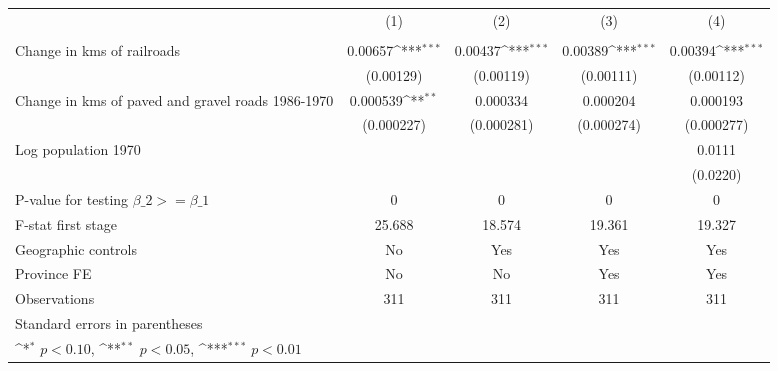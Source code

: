 {
\def\sym#1{\ifmmode^{#1}\else\(^{#1}\)\fi}
\begin{tabular}{l*{4}{c}}
\hline\hline
                &\multicolumn{1}{c}{(1)}&\multicolumn{1}{c}{(2)}&\multicolumn{1}{c}{(3)}&\multicolumn{1}{c}{(4)}\\
                &\multicolumn{1}{c}{}&\multicolumn{1}{c}{}&\multicolumn{1}{c}{}&\multicolumn{1}{c}{}\\
\hline
Change in kms of railroads&  0.00657\sym{***}&  0.00437\sym{***}&  0.00389\sym{***}&  0.00394\sym{***}\\
                &(0.00129)         &(0.00119)         &(0.00111)         &(0.00112)         \\
[1em]
Change in kms of paved and gravel roads 1986-1970& 0.000539\sym{**} & 0.000334         & 0.000204         & 0.000193         \\
                &(0.000227)         &(0.000281)         &(0.000274)         &(0.000277)         \\
[1em]
Log population 1970&                  &                  &                  &   0.0111         \\
                &                  &                  &                  & (0.0220)         \\
\hline
P-value for testing $\beta\_{2} >= \beta\_{1}$&        0         &        0         &        0         &        0         \\
F-stat first stage&   25.688         &   18.574         &   19.361         &   19.327         \\
Geographic controls&       No         &      Yes         &      Yes         &      Yes         \\
Province FE     &       No         &       No         &      Yes         &      Yes         \\
Observations    &      311         &      311         &      311         &      311         \\
\hline\hline
\multicolumn{5}{l}{\footnotesize Standard errors in parentheses}\\
\multicolumn{5}{l}{\footnotesize \sym{*} \(p<0.10\), \sym{**} \(p<0.05\), \sym{***} \(p<0.01\)}\\
\end{tabular}
}
